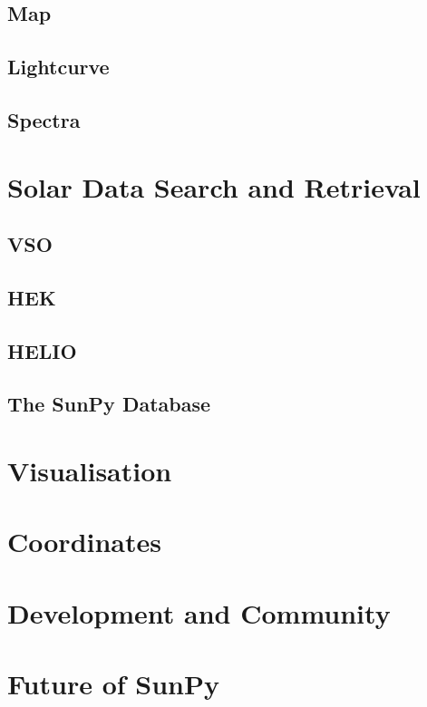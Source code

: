 \documentclass[12pt]{iopart}
\begin{document}
	\subsection{Map}
	
	\subsection{Lightcurve}
	
	\subsection{Spectra}

\section{Solar Data Search and Retrieval}

	\subsection{VSO}
	
	\subsection{HEK}
	
	\subsection{HELIO}
	
	\subsection{The SunPy Database}

\section{Visualisation}

\section{Coordinates}

\section{Development and Community}

\section{Future of SunPy}

{}
\end{document}

